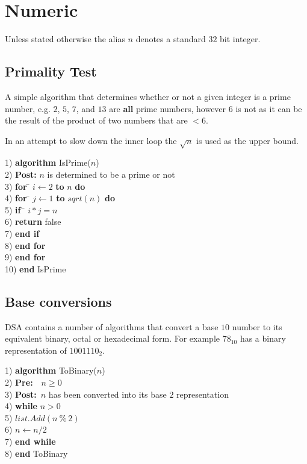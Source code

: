 \chapter{Numeric}
Unless stated otherwise the alias $n$ denotes a standard $32$ bit integer.

\section{Primality Test} \label{cha:Primality}
A simple algorithm that determines whether or not a given integer is a prime number, e.g. $2$, $5$, $7$, and $13$ are \textbf{all} prime numbers, however $6$ is not as it can be the result of the product of two numbers that are $< 6$.

In an attempt to slow down the inner loop the $\sqrt{n}$ is used as the upper bound.

\begin{tabbing}
1) \textbf{alg}\= \textbf{orithm} IsPrime($n$)\\
2) \> \textbf{Post:} $n$ is determined to be a prime or not \\
3) \> \textbf{for} \= $i \leftarrow 2$ \textbf{to} $n$ \textbf{do}\\
4) \> \> \textbf{for} \= $j \leftarrow 1$ \textbf{to} $sqrt(n)$ \textbf{do}\\
5) \> \> \> \textbf{if}~\= $i * j = n$\\
6) \> \> \> \> \textbf{return} false\\
7) \> \> \> \textbf{end if}\\
8) \> \> \textbf{end for}\\	
9) \> \textbf{end for}\\
10) \textbf{end} IsPrime
\end{tabbing}

\section{Base conversions}
DSA contains a number of algorithms that convert a base $10$ number to its equivalent binary, octal or hexadecimal form. For example $78_{10}$ has a binary representation of $1001110_{2}$.

\begin{tabbing}
1) \textbf{alg}\= \textbf{orithm} ToBinary($n$)\\
2) \> \textbf{Pre:}~~$n \geq 0$ \\
3) \> \textbf{Post:}~$n$ has been converted into its base $2$ representation \\
4) \> \textbf{whi}\= \textbf{le} $n > 0$\\
5) \> \> $list.Add(n~\%~2)$\\
6) \> \> $n \leftarrow n / 2$\\
7) \> \textbf{end while}\\
8) \textbf{end} ToBinary\\
\end{tabbing}
